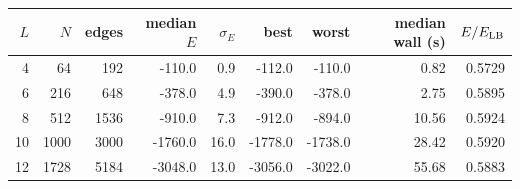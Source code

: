 \begin{tabular}{rrrrrrrrr}
\toprule
$L$ & $N$ & edges & median $E$ & $\sigma_E$ & best & worst & median wall (s) & $E/E_{\rm LB}$ \\
\midrule
4 & 64 & 192 & -110.0 & 0.9 & -112.0 & -110.0 & 0.82 & 0.5729 \\
6 & 216 & 648 & -378.0 & 4.9 & -390.0 & -378.0 & 2.75 & 0.5895 \\
8 & 512 & 1536 & -910.0 & 7.3 & -912.0 & -894.0 & 10.56 & 0.5924 \\
10 & 1000 & 3000 & -1760.0 & 16.0 & -1778.0 & -1738.0 & 28.42 & 0.5920 \\
12 & 1728 & 5184 & -3048.0 & 13.0 & -3056.0 & -3022.0 & 55.68 & 0.5883 \\
\bottomrule
\end{tabular}
